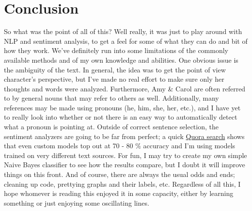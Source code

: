 \documentclass[11pt]{article}
\begin{document}
\section{Conclusion}
\noindent
So what was the point of all of this? Well really, it was just to play around with NLP and sentiment analysis, to get a feel for some of what they can do and bit of how they work. We've definitely run into some limitations of the commonly available methods and of my own knowledge and abilities. One obvious issue is the ambiguity of the text. In general, the idea was to get the point of view character's perspective, but I've made no real effort to make sure only her thoughts and words were analyzed. Furthermore, Amy \& Carol are often referred to by general nouns that may refer to others as well. Additionally, many references may be made using pronouns (he, him, she, her, etc.), and I have yet to really look into whether or not there is an easy way to automatically detect what a pronoun is pointing at. Outside of correct sentence selection, the sentiment analyzers are going to be far from perfect; a quick \href{https://www.quora.com/What-is-the-accepted-accuracy-of-sentiment-analysis}{Quora search} shows that even custom models top out at 70 - 80 \% accuracy and I'm using models trained on very different text sources. For fun, I may try to create my own simple Naive Bayes classifier to see how the results compare, but I doubt it will improve things on this front. And of course, there are always the usual odds and ends; cleaning up code, prettying graphs and their labels, etc. Regardless of all this, I hope whomever is reading this enjoyed it in some capacity, either by learning something or just enjoying some oscillating lines. 
\end{document}
